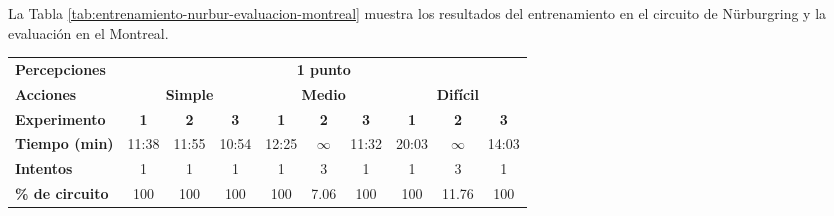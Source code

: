 La Tabla \ref{tab:entrenamiento-nurbur-evaluacion-montreal} muestra los resultados del entrenamiento en el circuito de Nürburgring y la evaluación en el Montreal.

\newpage


\begin{table}[ht!]
\centering
\begin{tabular}{|l|c|c|c|c|c|c|c|c|c|}
\hline
\rowcolor[HTML]{EFEFEF} 
\multicolumn{10}{|c|}{\cellcolor[HTML]{EFEFEF}\textbf{Entrenamiento en Nürburgring y ejecución en Montreal}}                                                                                                                                                            \\ \hline
\rowcolor[HTML]{EFEFEF} 
\textbf{Percepciones}                           & \multicolumn{9}{c|}{\cellcolor[HTML]{EFEFEF}\textbf{1 punto}}                                                                                                                                                         \\ \hline
\rowcolor[HTML]{EFEFEF} 
\textbf{Acciones}                               & \multicolumn{3}{c|}{\cellcolor[HTML]{EFEFEF}\textbf{Simple}} & \multicolumn{3}{c|}{\cellcolor[HTML]{EFEFEF}\textbf{Medio}}               & \multicolumn{3}{c|}{\cellcolor[HTML]{EFEFEF}\textbf{Difícil}}              \\ \hline
\rowcolor[HTML]{EFEFEF} 
\textbf{Experimento}                            & \textbf{1}                      & \textbf{2}   & \textbf{3}  & \textbf{1}                    & \textbf{2}                   & \textbf{3} & \textbf{1}                    & \textbf{2}                    & \textbf{3} \\ \hline
\rowcolor[HTML]{FFFFFF} 
\cellcolor[HTML]{EFEFEF}\textbf{Tiempo (min)}   & 11:38                           & 11:55        & \cellcolor[HTML]{32CB00}10:54       & 12:25                         & $\infty$                      & 11:32      & 20:03                         & $\infty$                       & 14:03      \\ \hline
\rowcolor[HTML]{FFFFFF} 
\cellcolor[HTML]{EFEFEF}\textbf{Intentos}       & 1                               & 1            & 1           & 1                             & 3                            & 1          & 1                             & 3                             & 1          \\ \hline
\rowcolor[HTML]{32CB00} 
\cellcolor[HTML]{EFEFEF}\textbf{\% de circuito} & 100                             & 100          & 100         & 100                           & \cellcolor[HTML]{FFC702}7.06 & 100        & 100                           & \cellcolor[HTML]{FFC702}11.76 & 100        \\ \hline

\end{tabular}
\end{table}
